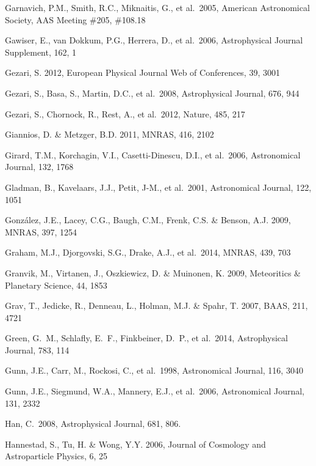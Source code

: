 \documentclass{emulateapj}
\begin{document}
\begin{thebibliography}{}
\bibitem[()]{} Garnavich, P.M., Smith, R.C., Miknaitis, G., et al.~2005, 
             American Astronomical Society, AAS Meeting \#205, \#108.18 	

\bibitem[()]{} Gawiser, E., van Dokkum, P.G., Herrera, D., et al.~2006, Astrophysical Journal Supplement, 162, 1 

	
\bibitem[()]{} Gezari, S. 2012, European Physical Journal Web of Conferences, 39, 3001

\bibitem[()]{} Gezari, S., Basa, S., Martin, D.C., et al.~2008, Astrophysical Journal, 676, 944

\bibitem[()]{} Gezari, S., Chornock, R., Rest, A., et al.~2012, Nature, 485, 217 

\bibitem[()]{} Giannios, D. \& Metzger, B.D. 2011, MNRAS, 416, 2102

\bibitem[()]{} Girard, T.M., Korchagin, V.I., Casetti-Dinescu, D.I., et al.~2006, Astronomical 
             Journal, 132, 1768

\bibitem[()]{} Gladman, B., Kavelaars, J.J., Petit, J-M., et al.~2001, Astronomical Journal, 122, 1051

\bibitem[()]{} Gonz\'{a}lez, J.E., Lacey, C.G., Baugh, C.M., Frenk, C.S. \& Benson, A.J. 2009, MNRAS, 397, 1254

\bibitem[()]{} Graham, M.J., Djorgovski, S.G., Drake, A.J., et al.~2014, MNRAS, 439, 703 

\bibitem[()]{} Granvik, M., Virtanen, J., Oszkiewicz, D. \& Muinonen, K. 2009, Meteoritics \& Planetary Science, 44, 1853

\bibitem[()]{} Grav, T., Jedicke, R., Denneau, L., Holman, M.J.  \& Spahr, T. 2007, BAAS, 211, 4721

\bibitem[()]{} Green, G.~M., Schlafly, E.~F., Finkbeiner, D.~P., et al.~2014, Astrophysical Journal, 783, 114 

\bibitem[()]{} Gunn, J.E., Carr, M., Rockosi, C., et al.~1998, Astronomical Journal, 116, 3040

\bibitem[()]{} Gunn, J.E., Siegmund, W.A., Mannery, E.J., et al.~2006, Astronomical Journal, 131, 2332

\bibitem[()]{} Han, C.~2008, Astrophysical Journal, 681, 806.

\bibitem[()]{} Hannestad, S., Tu, H. \& Wong, Y.Y. 2006, Journal of Cosmology and Astroparticle 
             Physics, 6, 25


\end{thebibliography}
\end{document}
